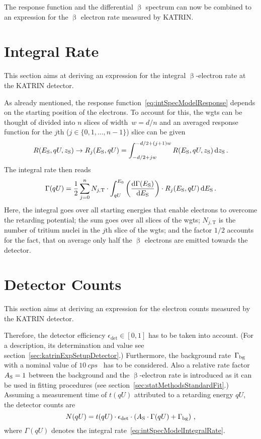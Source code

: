 The response function and the differential $\upbeta$ spectrum can now be combined to an expression for the $\upbeta$ electron rate measured by KATRIN. 

\section{Integral Rate}
\label{sec:intSpecModelIntegralRate}
This section aims at deriving an expression for the integral $\upbeta$-electron rate at the KATRIN detector. 

As already mentioned, the response function~\eqref{eq:intSpecModelResponse} depends on the starting position of the electrons. To account for this, the \gls{wgts} can be thought of divided into $n$ slices of width~$w=d/n$ and an averaged response function for the $j$th ($j\in\{0,1,\dots,n-1\}$) slice can be given
\begin{equation}
	R(E_\mathrm{S},qU,z_\mathrm{S}) \rightarrow
	R_j(E_\mathrm{S},qU) =
	\int_{-d/2+jw}^{-d/2+(j+1)w}
		R(E_\mathrm{S},qU,z_\mathrm{S})
	\mathop{}\!\mathrm{d} z_\mathrm{S}
	\text{\,.}
\end{equation}
The integral rate then reads~\cite{Kleesiek2019}
\begin{equation}
	\label{eq:intSpecModelIntegralRate}
	\Gamma(qU) = 
	\frac{1}{2} 
	\sum_{j=0}^{n} N_{j, \mathrm{T}} \cdot
		\int_{qU}^{E_0} 
			\left(\frac{\mathop{}\!\mathrm{d} \Gamma(E_\mathrm{S})}{ \mathop{}\!\mathrm{d} E_\mathrm{S}}\right) \cdot 
			R_j(E_\mathrm{S}, qU) 
		\mathop{}\!\mathrm{d} E_\mathrm{S}
		\text{\,.}
\end{equation}
Here, the integral goes over all starting energies that enable electrons to overcome the retarding potential; the sum goes over all slices of the \gls{wgts}; $N_{j, \mathrm{T}}$ is the number of tritium nuclei in the $j$th slice of the \gls{wgts}; and the factor $1/2$ accounts for the fact, that on average only half the $\upbeta$ electrons are emitted towards the detector.

\section{Detector Counts}
This section aims at deriving an expression for the electron counts measured by the KATRIN detector. 

Therefore, the detector efficiency \mbox{$\epsilon_\mathrm{det}\in[0,1]$} has to be taken into account. (For a description, its determination and value see section~\ref{sec:katrinExpSetupDetector}.) Furthermore, the background rate~$\Gamma_{\mathrm{bg}}$ with a nominal value of $\SI{10}{cps}$~\cite{Angrik:2005ep} has to be considered. Also a relative rate factor $A_{\mathrm{S}}=1$ between the background and the $\upbeta$-electron rate is introduced as it can be used in fitting procedures (see section~\ref{sec:statMethodsStandardFit}.) Assuming a measurement time of $t(qU)$ attributed to a retarding energy $qU$, the detector counts are~\cite{Kleesiek2014}
\begin{equation}
\label{eq:intSpecModelDetectorCounts}
	N(qU) = t(qU)\cdot\epsilon_\mathrm{det}\cdot
	\left(
		A_{\mathrm{S}}\cdot \Gamma(qU) + \Gamma_{\mathrm{bg}}
	\right)
	\text{\,,}
\end{equation}
where $\Gamma(qU)$ denotes the integral rate~\eqref{eq:intSpecModelIntegralRate}. 

